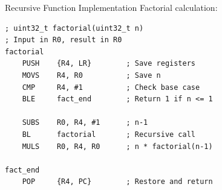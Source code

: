 \begin{example2}{Recursive Function Implementation}
Factorial calculation:
\begin{lstlisting}[language=armasm, style=basesmol]
; uint32_t factorial(uint32_t n)
; Input in R0, result in R0
factorial
    PUSH    {R4, LR}        ; Save registers
    MOVS    R4, R0          ; Save n
    CMP     R4, #1          ; Check base case
    BLE     fact_end        ; Return 1 if n <= 1
    
    SUBS    R0, R4, #1      ; n-1
    BL      factorial       ; Recursive call
    MULS    R0, R4, R0      ; n * factorial(n-1)
    
fact_end
    POP     {R4, PC}        ; Restore and return
\end{lstlisting}
\end{example2}









